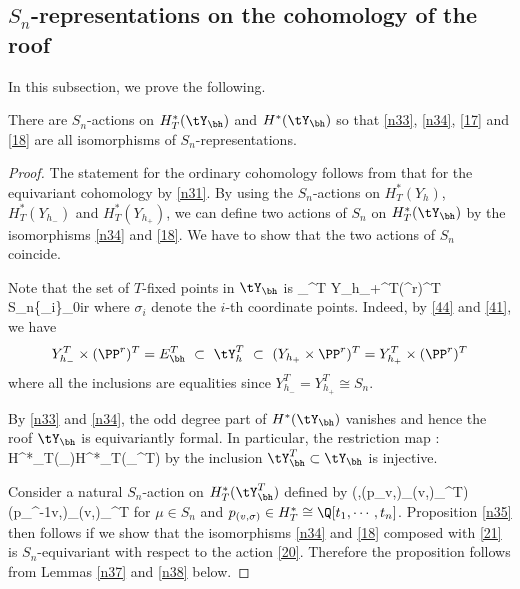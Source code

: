 \subsection{\texorpdfstring{$S_n$}{Sn}-representations on the cohomology of the roof}
In this subsection, we prove the following.

\begin{proposition}\label{n35}
There are $S_n$-actions on $H^*_T(\tY_\bh)$ and $H^*(\tY_\bh)$ so that \eqref{n33}, \eqref{n34}, \eqref{17} and \eqref{18} are all isomorphisms of $S_n$-representations. 
\end{proposition}


\begin{proof} 
The statement for the ordinary cohomology follows from that for the equivariant cohomology by \eqref{n31}.  
By using the $S_n$-actions on $H^*_T(Y_h)$, $H^*_T(Y_{h_-})$ and $H^*_T(Y_{h_+})$, we can define two actions of $S_n$ on $H^*_T(\tY_\bh)$ by the isomorphisms \eqref{n34} and \eqref{18}. 
We have to show that the two actions of $S_n$ coincide. 

Note that the set of $T$-fixed points in $\tY_\bh$ is
		\beq \label{26} \tY_{\bh}^T \cong Y_{h_+}^T\times (\PP^r)^T \cong S_n\times \{\sigma_i\}_{0\leq i\leq r}\eeq
		where $\sigma_i$ denote the $i$-th coordinate points.
		Indeed, by \eqref{44} and \eqref{41}, we have
		\[Y_{h_-}^T\times (\PP^r)^T=E_\bh^T~\subset~ \tY_h^T ~\subset ~(Y_{h_+}\times \PP^r)^T=Y_{h_+}^T\times (\PP^{r})^T\]
		where all the inclusions are equalities since $Y_{h_-}^T=Y_{h_+}^T\cong S_n$.
		
By \eqref{n33} and \eqref{n34},  the odd degree part of $H^*(\tY_{\bh})$ vanishes and hence the roof $\tY_\bh$ is equivariantly formal. In particular, the restriction map
		\beq \label{21} \res: H^*_T(\tY_{\bh})\lra H^*_T(\tY_{\bh}^T)\eeq
by the inclusion $\tY_\bh^T\subset \tY_\bh$ is injective. 

					
		Consider a natural $S_n$-action on $H^*_T(\tY_{\bh}^T)$ defined by
		\beq \label{20} (\mu,(p_{v,\sigma})_{(v,\sigma)\in \tY_{\bh}^T})\mapsto  (p_{\mu^{-1}v,\sigma})_{(v,\sigma)\in \tY_{\bh}^T}\eeq
		for $\mu\in S_n$ and $p_{(v,\sigma)}\in H^*_T\cong \Q[t_1,\cdots, t_n]$.
Proposition \ref{n35} then follows if we show that the isomorphisms \eqref{n34} and \eqref{18} composed with \eqref{21} is $S_n$-equivariant with respect to the action \eqref{20}.  
Therefore the proposition follows from Lemmas \ref{n37} and \ref{n38} below. 
\end{proof}

